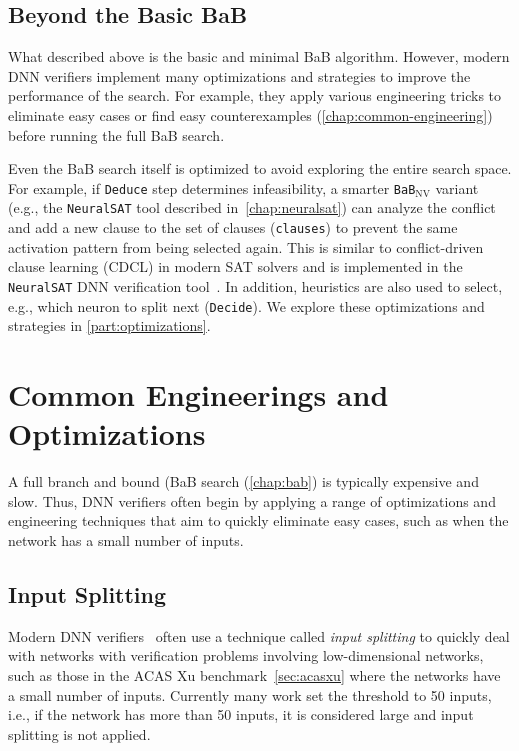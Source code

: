 \documentclass[oneside,11pt,dvipsnames]{book}
\numberwithin{equation}{section}
\theoremstyle{definition}
\theoremstyle{remark}
\newcommand{\functiontextformat}[1]{\textrm{\texttt{#1}}}
\newcommand{\tvn}[1]{\iftoggle{usecomment}{{\color{red}{[TVN]: #1}}}{}}
\newcommand{\prooflang}{\texttt{BaB$_{\text{ProofLang}}$}}
\newcommand{\bab}{\texttt{BaB$_{\text{NV}}$}}
\newcommand{\neuralsat}{\texttt{NeuralSAT}}
\begin{document}
\section{Beyond the Basic BaB} What described above is the basic and minimal BaB algorithm. However, modern DNN verifiers implement many optimizations and strategies to improve the performance of the search. For example, they apply various engineering tricks to eliminate easy cases or find easy counterexamples (\autoref{chap:common-engineering}) before running the full BaB search. 

Even the BaB search itself is optimized to avoid exploring the entire search space. For example, if \functiontextformat{Deduce} step determines infeasibility, a smarter \bab{} variant (e.g., the \neuralsat{} tool described in~\autoref{chap:neuralsat}) can analyze the conflict and add a new clause to the set of clauses (\texttt{clauses}) to prevent the same activation pattern from being selected again. This is similar to conflict-driven clause learning (CDCL) in modern SAT solvers and is implemented in the \neuralsat{} DNN verification tool~\cite{duong2025neuralsat}. In addition, heuristics are also used to select, e.g., which neuron to split next (\functiontextformat{Decide}). We explore these optimizations and strategies in \autoref{part:optimizations}.





\chapter{Common Engineerings and Optimizations}\label{chap:common-engineering}

A full branch and bound (BaB search (\autoref{chap:bab}) is typically expensive and slow. Thus, DNN verifiers often begin by applying a range of optimizations and engineering techniques that aim to quickly eliminate easy cases, such as when the network has a small number of inputs.

\section{Input Splitting} Modern DNN verifiers~\cite{katz2019marabou,katz2022reluplex,bak2021nnenum,duong2025neuralsat} often use a technique called \emph{input splitting} to quickly deal with networks with verification problems involving low-dimensional networks, such as those in the ACAS Xu benchmark~\autoref{sec:acasxu} where the networks have a small number of inputs. Currently many work set the threshold to 50 inputs, i.e., if the network has more than 50 inputs, it is considered large and input splitting is not applied.
\end{document}
